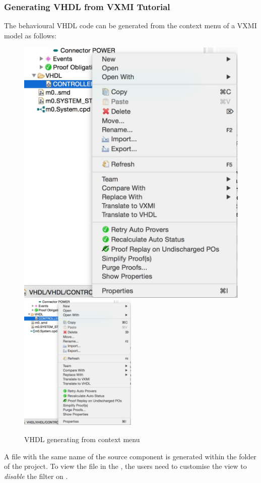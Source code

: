 \subsubsection{Generating VHDL from VXMI Tutorial}
\label{sec:vxmi-2-vhdl-tutorial}
The behavioural VHDL code can be generated from the context menu of a VXMI model as follows: 
\begin{figure}[!htbp]
  \centering
  \ifplastex
  \includegraphics[width=512]{figures/vhdl-context_menu}
  \else
  \includegraphics[width=0.5\textwidth]{figures/vhdl-context_menu}
  \fi
  \caption{VHDL generating from context menu}
  \label{fig:vhdl-context_menu}
\end{figure}
A  file with the same name of the source component is generated within the  folder of the project.  To view the file in the , the users need to customise the view to \emph{disable} the filter on .

